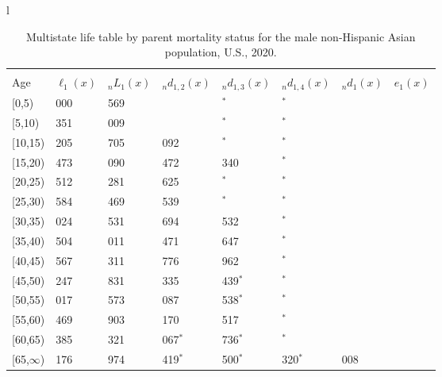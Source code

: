 \documentclass[
]{article}
\begin{document}
\begin{table}
\caption{\label{tab:table-nhasian-male}Multistate life table by parent mortality status for the male non-Hispanic Asian population, U.S., 2020.}

\centering
\fontsize{9}{11}\selectfont
\begin{tabular}[t]{l}
\hline
\begin{tabular}{>{\raggedright\arraybackslash}p{.45in}>{\raggedleft\arraybackslash}p{.65in}>{\raggedleft\arraybackslash}p{.65in}>{\raggedleft\arraybackslash}p{.65in}>{\raggedleft\arraybackslash}p{.65in}>{\raggedleft\arraybackslash}p{.65in}>{\raggedleft\arraybackslash}p{.65in}>{\raggedleft\arraybackslash}p{.65in}}
\toprule
\multicolumn{1}{c}{ } & \multicolumn{7}{c}{(1) Lost neither} \\
\cmidrule(l{3pt}r{3pt}){2-8}
Age & $\ell_{1}(x)$ & ${}_nL_{1}(x)$ & ${}_nd_{1,2}(x)$ & ${}_nd_{1,3}(x)$ & ${}_nd_{1,4}(x)$ & ${}_nd_{1}(x)$ & $e_{1}(x)$\\
\midrule
{}[0,5) & 100 000 & 496 569 & 761 & 511$^{*}$ & 0$^{*}$ & 378 & 45\\
{}[5,10) & 98 351 & 489 009 & 927 & 191$^{*}$ & 0$^{*}$ & 28 & 40\\
{}[10,15) & 97 205 & 480 705 & 1 092 & 588$^{*}$ & 0$^{*}$ & 52 & 36\\
{}[15,20) & 95 473 & 469 090 & 1 472 & 1 340 & 0$^{*}$ & 148 & 31\\
{}[20,25) & 92 512 & 449 281 & 2 625 & 818$^{*}$ & 214$^{*}$ & 271 & 26\\
\addlinespace
{}[25,30) & 88 584 & 422 469 & 3 539 & 741$^{*}$ & 0$^{*}$ & 280 & 22\\
{}[30,35) & 84 024 & 394 531 & 2 694 & 1 532 & 0$^{*}$ & 293 & 17\\
{}[35,40) & 79 504 & 353 011 & 4 471 & 2 647 & 454$^{*}$ & 365 & 13\\
{}[40,45) & 71 567 & 301 311 & 3 776 & 1 962 & 163$^{*}$ & 419 & 10\\
{}[45,50) & 65 247 & 244 831 & 7 335 & 1 439$^{*}$ & 915$^{*}$ & 542 & 7\\
\addlinespace
{}[50,55) & 55 017 & 187 573 & 6 087 & 1 538$^{*}$ & 254$^{*}$ & 669 & 4\\
{}[55,60) & 46 469 & 122 903 & 7 170 & 4 517 & 733$^{*}$ & 665 & 3\\
{}[60,65) & 33 385 & 55 321 & 4 067$^{*}$ & 2 736$^{*}$ & 920$^{*}$ & 485 & 1\\
{}[65,$\infty$) & 25 176 & 60 974 & 4 419$^{*}$ & 2 500$^{*}$ & 1 320$^{*}$ & 3 008 & 1\\

\end{tabular}
\end{tabular}
\end{table}
\end{document}
